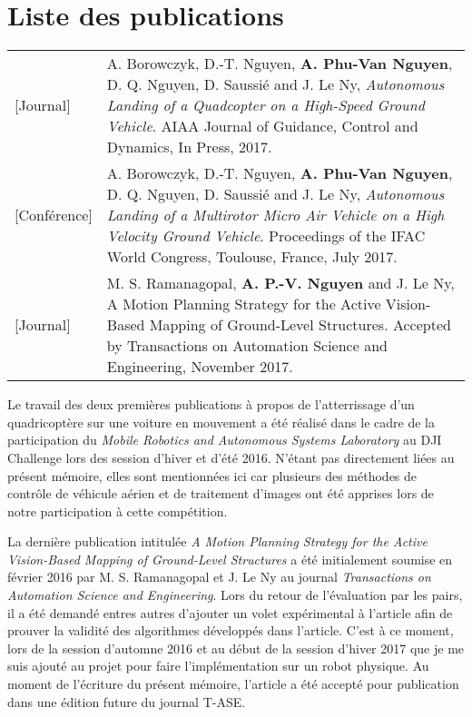\chapter*{Liste des publications}

\begin{longtable}{lp{5in}}
  [Journal]     & A. Borowczyk, D.-T. Nguyen, \textbf{A. Phu-Van Nguyen}, D. Q. Nguyen, D. Saussié and J. Le Ny, \textit{Autonomous Landing of a Quadcopter on a High-Speed Ground Vehicle}. AIAA Journal of Guidance, Control and Dynamics, In Press, 2017.\\

  [Conférence]  & A. Borowczyk, D.-T. Nguyen, \textbf{A. Phu-Van Nguyen}, D. Q. Nguyen, D. Saussié and J. Le Ny, \textit{Autonomous Landing of a Multirotor Micro Air Vehicle on a High Velocity Ground Vehicle}. Proceedings of the IFAC World Congress, Toulouse, France, July 2017.\\

  [Journal]      & M. S. Ramanagopal, \textbf{A. P.-V. Nguyen} and J. Le Ny, A Motion Planning Strategy for the Active Vision-Based Mapping of Ground-Level Structures. Accepted by Transactions on Automation Science and Engineering, November 2017.
\end{longtable}

Le travail des deux premières publications à propos de l'atterrissage d'un quadricoptère sur une voiture en mouvement a été réalisé dans le cadre de la participation du \textit{Mobile Robotics and Autonomous Systems Laboratory} au DJI Challenge lors des session d'hiver et d'été 2016. N'étant pas directement liées au présent mémoire, elles sont mentionnées ici car plusieurs des méthodes de contrôle de véhicule aérien et de traitement d'images ont été apprises lors de notre participation à cette compétition.

La dernière publication intitulée \textit{A Motion Planning Strategy for the Active Vision-Based Mapping of Ground-Level Structures} a été initialement soumise en février 2016 par M. S. Ramanagopal et J. Le Ny au journal \textit{Transactions on Automation Science and Engineering}. Lors du retour de l'évaluation par les pairs, il a été demandé entres autres d'ajouter un volet expérimental à l'article afin de prouver la validité des algorithmes développés dans l'article. C'est à ce moment, lors de la session d'automne 2016 et au début de la session d'hiver 2017 que je me suis ajouté au projet pour faire l'implémentation sur un robot physique. Au moment de l'écriture du présent mémoire, l'article a été accepté pour publication dans une édition future du journal T-ASE.
